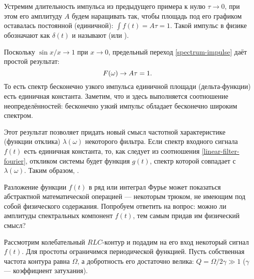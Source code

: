 \begin{lab:example}\label{example:delta}
Устремим длительность импульса из предыдущего примера к нулю $\tau\to 0$,
при этом его амплитуду $A$ будем наращивать так, чтобы площадь
под его графиком оставалась постоянной (единичной): $\int f(t) = A \tau = 1$.
Такой импульс в физике обозначают как $\delta(t)$ и называют 
(или ).

Поскольку $\sin x/x\to 1$ при $x\to 0$,
предельный переход \eqref{spectrum-impulse} даёт простой результат:
\begin{equation}
    \eqmark{spectrum-delta}
    F(\omega)\to A\tau =1.
\end{equation}
То есть спектр бесконечно узкого импульса единичной площади (дельта-функции)
есть единичная константа. Заметим, что и здесь выполняется соотношение
неопределённостей: бесконечно узкий импульс 
обладает бесконечно широким спектром.

Этот результат позволяет придать новый смысл частотной характеристике
(функции отклика) $\lambda(\omega)$ некоторого фильтра.
Если спектр входного сигнала $f(t)$ есть единичная константа,
то, как следует из соотношения \eqref{linear-filter-fourier},
откликом системы будет функция $g(t)$, спектр которой совпадает
с $\lambda(\omega)$. Таким образом, .
\end{lab:example}


\label{sec:spectrum-meaning}

Разложение функции $f(t)$ в ряд или интеграл Фурье может показаться
абстрактной математической операцией --- некоторым трюком, не имеющим
под собой физического содержания. Попробуем ответить на вопрос:
можно ли  амплитуды спектральных компонент $f(t)$,
тем самым придав им физический смысл?

Рассмотрим колебательный $RLC$-контур и подадим на его вход некоторый сигнал $f(t)$.
Для простоты ограничимся периодической функцией.
Пусть собственная частота контура равна $\Omega$, а добротность его
достаточно велика: $Q=\Omega/2\gamma \gg 1$ ($\gamma$ --- коэффициент затухания).

